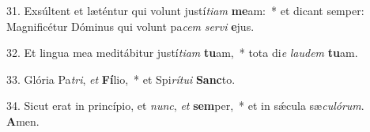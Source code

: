 31. Exsúltent et læténtur qui volunt justí\textit{ti}\textit{am} \textbf{me}am:~*  et dicant semper: Magnificétur Dóminus qui volunt pa\textit{cem} \textit{ser}\textit{vi} \textbf{e}jus.\

32. Et lingua mea meditábitur justí\textit{ti}\textit{am} \textbf{tu}am,~*  tota di\textit{e} \textit{lau}\textit{dem} \textbf{tu}am.\

33. Glória Pa\textit{tri}, \textit{et} \textbf{Fí}lio,~*  et Spi\textit{rí}\textit{tu}\textit{i} \textbf{Sanc}to.\

34. Sicut erat in princípio, et \textit{nunc}, \textit{et} \textbf{sem}per,~*  et in sǽcula sæ\textit{cu}\textit{ló}\textit{rum}. \textbf{A}men.\

